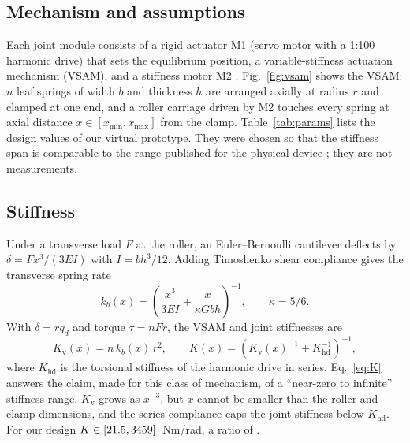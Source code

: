 \documentclass[journal]{IEEEtran}
\begin{document}
\subsection{Mechanism and assumptions}
Each joint module consists of a rigid actuator M1 (servo motor with a 1:100 harmonic drive) that sets the equilibrium position, a variable-stiffness actuation mechanism (VSAM), and a stiffness motor M2 \cite{sariyildiz2023}. Fig.~\ref{fig:vsam} shows the VSAM: $n$ leaf springs of width $b$ and thickness $h$ are arranged axially at radius $r$ and clamped at one end, and a roller carriage driven by M2 touches every spring at axial distance $x\in[x_{\min},x_{\max}]$ from the clamp. Table~\ref{tab:params} lists the design values of our virtual prototype. They were chosen so that the stiffness span is comparable to the range published for the physical device \cite{sariyildiz2023}; they are not measurements.

\subsection{Stiffness}
Under a transverse load $F$ at the roller, an Euler--Bernoulli cantilever deflects by $\delta = Fx^3/(3EI)$ with $I=bh^3/12$. Adding Timoshenko shear compliance \cite{cowper1966} gives the transverse spring rate
\begin{equation}
k_b(x)=\left(\frac{x^3}{3EI}+\frac{x}{\kappa G b h}\right)^{-1},\qquad \kappa=5/6 .
\end{equation}
With $\delta=r q_d$ and torque $\tau=nFr$, the VSAM and joint stiffnesses are
\begin{equation}
K_\mathrm{v}(x)=n\,k_b(x)\,r^2,\qquad K(x)=\left(K_\mathrm{v}(x)^{-1}+K_\mathrm{hd}^{-1}\right)^{-1},
\label{eq:K}
\end{equation}
where $K_\mathrm{hd}$ is the torsional stiffness of the harmonic drive in series. Eq.~\eqref{eq:K} answers the claim, made for this class of mechanism, of a ``near-zero to infinite'' stiffness range. $K_\mathrm{v}$ grows as $x^{-3}$, but $x$ cannot be smaller than the roller and clamp dimensions, and the series compliance caps the joint stiffness below $K_\mathrm{hd}$. For our design $K\in[21.5,3459]$~Nm/rad, a ratio of \Kratio.
\end{document}
